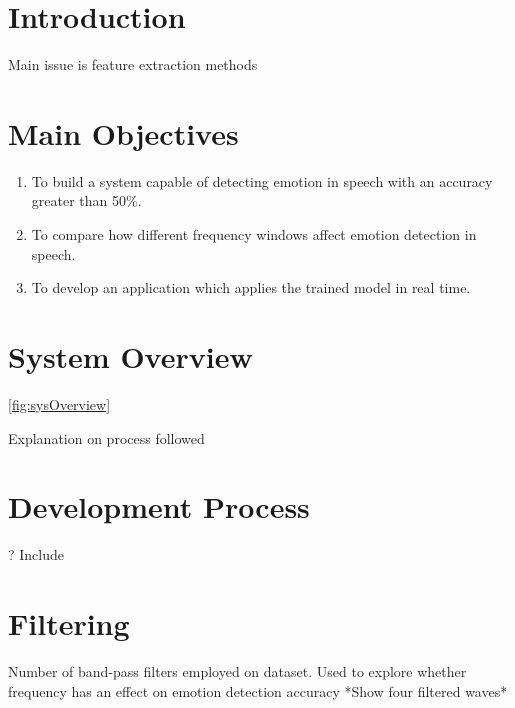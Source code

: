 \documentclass[a1,landscape]{a0poster}
\begin{document}
\begin{multicols}{4} %



\section*{Introduction}
Main issue is feature extraction methods



\section*{Main Objectives}

\begin{enumerate}
\item To build a system capable of detecting emotion in speech with an accuracy greater than 50\%. 
\item To compare how different frequency windows affect emotion detection in speech.
\item To develop an application which applies the trained model in real time.
\end{enumerate}


\section*{System Overview}
\ref{fig:sysOverview}

Explanation on process followed




\section*{Development Process}
? Include 


\section*{Filtering}
Number of band-pass filters employed on dataset. Used to explore whether frequency has an effect on emotion detection accuracy
*Show four filtered waves*

\end{multicols}
\end{document}
